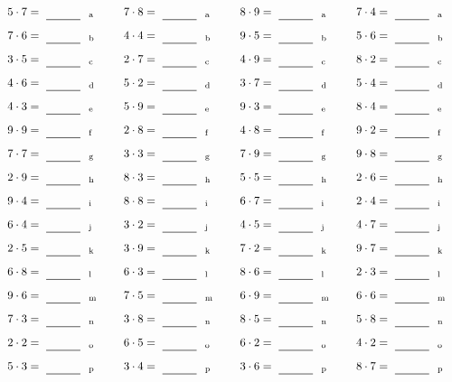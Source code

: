 \documentclass
[
  draft    = true,
  fontsize = 11pt,
  parskip  = half-
]
{scrartcl}
\begin{document}
\par\vfill\par
\begin{align*}
    \pline{5\cdot7}&=\rline{a}
  & \pline{7\cdot8}&=\rline{a}
  & \pline{8\cdot9}&=\rline{a}
  & \pline{7\cdot4}&=\rline{a} \\[1ex]
    \pline{7\cdot6}&=\rline{b}
  & \pline{4\cdot4}&=\rline{b}
  & \pline{9\cdot5}&=\rline{b}
  & \pline{5\cdot6}&=\rline{b} \\[1ex]
    \pline{3\cdot5}&=\rline{c}
  & \pline{2\cdot7}&=\rline{c}
  & \pline{4\cdot9}&=\rline{c}
  & \pline{8\cdot2}&=\rline{c} \\[1ex]
    \pline{4\cdot6}&=\rline{d}
  & \pline{5\cdot2}&=\rline{d}
  & \pline{3\cdot7}&=\rline{d}
  & \pline{5\cdot4}&=\rline{d} \\[1ex]
    \pline{4\cdot3}&=\rline{e}
  & \pline{5\cdot9}&=\rline{e}
  & \pline{9\cdot3}&=\rline{e}
  & \pline{8\cdot4}&=\rline{e} \\[1ex]
    \pline{9\cdot9}&=\rline{f}
  & \pline{2\cdot8}&=\rline{f}
  & \pline{4\cdot8}&=\rline{f}
  & \pline{9\cdot2}&=\rline{f} \\[1ex]
    \pline{7\cdot7}&=\rline{g}
  & \pline{3\cdot3}&=\rline{g}
  & \pline{7\cdot9}&=\rline{g}
  & \pline{9\cdot8}&=\rline{g} \\[1ex]
    \pline{2\cdot9}&=\rline{h}
  & \pline{8\cdot3}&=\rline{h}
  & \pline{5\cdot5}&=\rline{h}
  & \pline{2\cdot6}&=\rline{h} \\[1ex]
    \pline{9\cdot4}&=\rline{i}
  & \pline{8\cdot8}&=\rline{i}
  & \pline{6\cdot7}&=\rline{i}
  & \pline{2\cdot4}&=\rline{i} \\[1ex]
    \pline{6\cdot4}&=\rline{j}
  & \pline{3\cdot2}&=\rline{j}
  & \pline{4\cdot5}&=\rline{j}
  & \pline{4\cdot7}&=\rline{j} \\[1ex]
    \pline{2\cdot5}&=\rline{k}
  & \pline{3\cdot9}&=\rline{k}
  & \pline{7\cdot2}&=\rline{k}
  & \pline{9\cdot7}&=\rline{k} \\[1ex]
    \pline{6\cdot8}&=\rline{l}
  & \pline{6\cdot3}&=\rline{l}
  & \pline{8\cdot6}&=\rline{l}
  & \pline{2\cdot3}&=\rline{l} \\[1ex]
    \pline{9\cdot6}&=\rline{m}
  & \pline{7\cdot5}&=\rline{m}
  & \pline{6\cdot9}&=\rline{m}
  & \pline{6\cdot6}&=\rline{m} \\[1ex]
    \pline{7\cdot3}&=\rline{n}
  & \pline{3\cdot8}&=\rline{n}
  & \pline{8\cdot5}&=\rline{n}
  & \pline{5\cdot8}&=\rline{n} \\[1ex]
    \pline{2\cdot2}&=\rline{o}
  & \pline{6\cdot5}&=\rline{o}
  & \pline{6\cdot2}&=\rline{o}
  & \pline{4\cdot2}&=\rline{o} \\[1ex]
    \pline{5\cdot3}&=\rline{p}
  & \pline{3\cdot4}&=\rline{p}
  & \pline{3\cdot6}&=\rline{p}
  & \pline{8\cdot7}&=\rline{p}
\end{align*}
\end{document}
